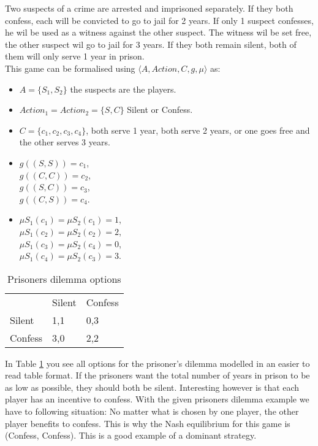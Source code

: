 Two suspects of a crime are arrested and imprisoned separately. If they both confess, each will be convicted to go to jail for 2 years. If only 1 suspect confesses, he wil be used as a witness against the other suspect. The witness wil be set free, the other suspect wil go to jail for 3 years. If they both remain silent, both of them will only serve 1 year in prison.\\
This game can be formalised using $\langle A,Action,C,g,\mu \rangle$ as:

\begin{itemize}
    \item $A = \{S_{1}, S_{2} \}$ the suspects are the players.
    \item $Action_{1} = Action_{2} = \{S, C\}$ Silent or Confess.
    \item $C = \{c_{1},c_{2},c_{3},c_{4}\}$, both serve 1 year, both serve 2 years, or one goes free and the other serves 3 years.
    \item $g((S,S)) = c_{1}$, \\
    $g((C,C)) = c_{2}$, \\
    $g((S,C)) = c_{3}$, \\
    $g((C,S)) = c_{4}$.
    \item $\mu S_{1}(c_{1}) = \mu S_{2}(c_{1}) = 1$, \\
    $\mu S_{1}(c_{2}) = \mu S_{2}(c_{2}) = 2$, \\
    $\mu S_{1}(c_{3}) = \mu S_{2}(c_{4}) = 0$, \\
    $\mu S_{1}(c_{4}) = \mu S_{2}(c_{3}) = 3$.
\end{itemize}

\begin{table}[h]
\centering
\begin{tabular}{lll}
 & Silent & Confess \\ \cline{2-3} 
\multicolumn{1}{l|}{Silent} & \multicolumn{1}{l|}{1,1} & \multicolumn{1}{l|}{0,3} \\ \cline{2-3} 
\multicolumn{1}{l|}{Confess} & \multicolumn{1}{l|}{3,0} & \multicolumn{1}{l|}{2,2} \\ \cline{2-3} 
\end{tabular}
\caption{Prisoners dilemma options}
\label{prisoners-d}
\end{table}

In Table \ref{prisoners-d} you see all options for the prisoner's dilemma modelled in an easier to read table format. If the prisoners want the total number of years in prison to be as low as possible, they should both be silent. Interesting however is that each player has an incentive to confess. With the given prisoners dilemma example we have to following situation: No matter what is chosen by one player, the other player benefits to confess. This is why the Nash equilibrium for this game is (Confess, Confess). This is a good example of a dominant strategy. 

